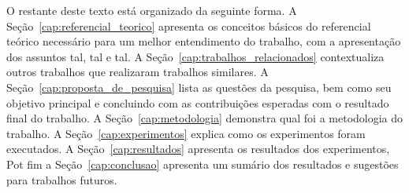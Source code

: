 O restante deste texto está organizado da seguinte forma. A Seção~\ref{cap:referencial_teorico} apresenta os conceitos básicos do referencial teórico necessário para um melhor entendimento do trabalho, com a apresentação dos assuntos tal, tal e tal. A Seção~\ref{cap:trabalhos_relacionados} contextualiza outros trabalhos que realizaram trabalhos similares. A Seção~\ref{cap:proposta_de_pesquisa} lista as questões da pesquisa, bem como seu objetivo principal e concluindo com as contribuições esperadas com o resultado final do trabalho. A Seção~\ref{cap:metodologia} demonstra qual foi a metodologia do trabalho. A Seção~\ref{cap:experimentos} explica como os experimentos foram executados. A Seção~\ref{cap:resultados} apresenta os resultados dos experimentos, Pot fim a Seção~\ref{cap:conclusao} apresenta um sumário dos resultados e sugestões para trabalhos futuros.